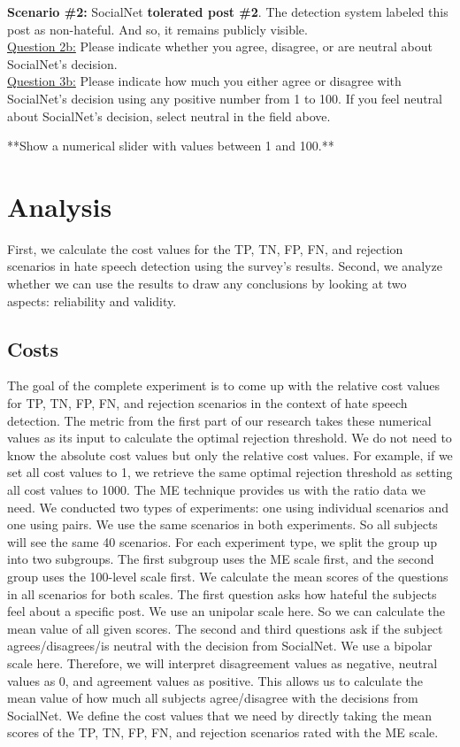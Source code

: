 \documentclass[a4paper]{article}
\begin{document}
\textbf{Scenario \#2:} SocialNet \textbf{tolerated post \#2}. The detection system labeled this post as non-hateful. And so, it remains publicly visible.\\

\underline{Question 2b:} Please indicate whether you agree, disagree, or are neutral about SocialNet’s decision.\\

\underline{Question 3b:} Please indicate how much you either agree or disagree with SocialNet’s decision using any positive number from 1 to 100. If you feel neutral about SocialNet’s decision, select neutral in the field above.

**Show a numerical slider with values between 1 and 100.**

\section{Analysis}
First, we calculate the cost values for the TP, TN, FP, FN, and rejection scenarios in hate speech detection using the survey's results. Second, we analyze whether we can use the results to draw any conclusions by looking at two aspects: reliability and validity.

\subsection{Costs}
The goal of the complete experiment is to come up with the relative cost values for TP, TN, FP, FN, and rejection scenarios in the context of hate speech detection. The metric from the first part of our research takes these numerical values as its input to calculate the optimal rejection threshold. We do not need to know the absolute cost values but only the relative cost values. For example, if we set all cost values to 1, we retrieve the same optimal rejection threshold as setting all cost values to 1000. The ME technique provides us with the ratio data we need. We conducted two types of experiments: one using individual scenarios and one using pairs. We use the same scenarios in both experiments. So all subjects will see the same 40 scenarios. For each experiment type, we split the group up into two subgroups. The first subgroup uses the ME scale first, and the second group uses the 100-level scale first. We calculate the mean scores of the questions in all scenarios for both scales. The first question asks how hateful the subjects feel about a specific post. We use an unipolar scale here. So we can calculate the mean value of all given scores. The second and third questions ask if the subject agrees/disagrees/is neutral with the decision from SocialNet. We use a bipolar scale here. Therefore, we will interpret disagreement values as negative, neutral values as 0, and agreement values as positive. This allows us to calculate the mean value of how much all subjects agree/disagree with the decisions from SocialNet. We define the cost values that we need by directly taking the mean scores of the TP, TN, FP, FN, and rejection scenarios rated with the ME scale.
\end{document}
